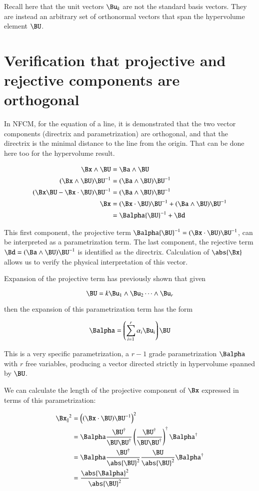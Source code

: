 Recall here that the unit vectors $\Bu_k$ are not the standard basis vectors.
They are instead an arbitrary set of orthonormal vectors that span the hypervolume element $\BU$.

\section{Verification that projective and rejective components are orthogonal }

In NFCM, for the equation of a line, it is demonstrated that the two vector components (directrix and parametrization) are orthogonal, and that the directrix is the minimal distance to the line from the origin.  That can be done here too for the hypervolume result.

\begin{align*}
\Bx \wedge \BU &= \Ba \wedge \BU \\
(\Bx \wedge \BU){\BU}^{-1} &= (\Ba \wedge \BU){\BU}^{-1} \\
(\Bx\BU - \Bx \cdot \BU){\BU}^{-1} &= (\Ba \wedge \BU){\BU}^{-1} \\
\Bx &= (\Bx \cdot \BU){\BU}^{-1} + (\Ba \wedge \BU){\BU}^{-1} \\
    &= \Balpha{\BU}^{-1} + \Bd \\
\end{align*}

This first component, the projective term $\Balpha{\BU}^{-1} = (\Bx \cdot \BU){\BU}^{-1}$, can be interpreted as a parametrization term.  The 
last component, the rejective term $\Bd = (\Ba \wedge \BU){\BU}^{-1}$ is identified as the directrix.  Calculation of $\abs{\Bx}$ allows us to verify the physical interpretation of this vector.

Expansion of the projective term has previously shown that given

\[
\BU = k \Bu_1 \wedge \Bu_2 \cdots \wedge \Bu_r
\]

then the expansion of this parametrization term has the form

\[
\Balpha = \left(\sum_{i = 1}^{r}{\alpha_i \Bu_i}\right)\BU
\]

This is a very specific parametrization, a $r-1$ grade parametrization $\Balpha$ with $r$ free variables, producing
a vector directed strictly in hypervolume spanned by $\BU$.

We can calculate the length of the projective component of $\Bx$ expressed in terms of this parametrization:

\begin{align*}
{\Bx_\parallel}^2
&= \left((\Bx \cdot \BU) {\BU}^{-1}\right)^2 \\
&= \Balpha \frac{{\BU}^\dagger}{\BU \BU^\dagger}   \left( \frac{{\BU}^\dagger}{\BU \BU^\dagger} \right)^\dagger {\Balpha}^\dagger \\
&= \Balpha \frac{{\BU}^\dagger} {\abs{\BU}^2} \frac{\BU} {\abs{\BU}^2} {\Balpha}^\dagger \\
&= \frac{\abs{\Balpha}^2}{{\abs{\BU}^2}} \\
\end{align*}

